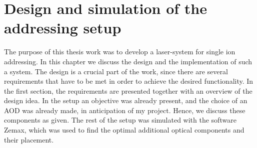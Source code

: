 \chapter{Design and simulation of the addressing setup}
The purpose of this thesis work was to develop a laser-system for single ion addressing. %
In this chapter we discuss the design and the implementation of such a system. The design is a crucial part of the work, since there are several requirements that have to be met in order to achieve the desired functionality. In the first section, the requirements are presented together with an overview of the design idea. In the setup an objective was already present, and the choice of an AOD was already made, in anticipation of my project. Hence, we discuss these components as given. The rest of the setup was simulated with the software Zemax, which was used to find the optimal additional optical components and their placement.
